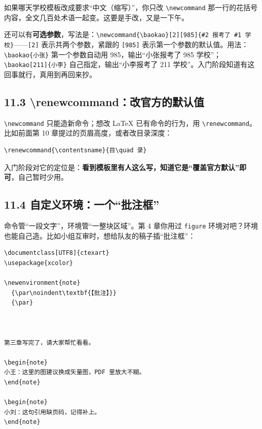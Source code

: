 如果哪天学校模板改成要求“中文（缩写）”，你只改 \texttt{\textbackslash{}newcommand} 那一行的花括号内容，全文几百处术语一起变。这要是手改，又是一下午。

还可以有\textbf{可选参数}，写法是：\texttt{\textbackslash{}newcommand\{\textbackslash{}baokao\}[2][985]\{\#2 报考了 \#1 学校\}}——\texttt{[2]} 表示共两个参数，紧跟的 \texttt{[985]} 表示第一个参数的默认值。用法：\texttt{\textbackslash{}baokao\{小张\}} 第一个参数自动用 985，输出“小张报考了 985 学校”；\texttt{\textbackslash{}baokao[211]\{小李\}} 自己指定，输出“小李报考了 211 学校”。入门阶段知道有这回事就行，真用到再回来抄。

\subsection*{11.3 \textbackslash{}renewcommand：改官方的默认值}

\texttt{\textbackslash{}newcommand} 只能造新命令；想改 LaTeX 已有命令的行为，用 \texttt{\textbackslash{}renewcommand}。比如前面第 10 章提过的页眉高度，或者改目录深度：

\begin{lstlisting}
\renewcommand{\contentsname}{目\quad 录}
\end{lstlisting}

入门阶段对它的定位是：\textbf{看到模板里有人这么写，知道它是“覆盖官方默认”即可}，自己暂时少用。

\subsection*{11.4 自定义环境：一个“批注框”}

命令管“一段文字”，环境管“一整块区域”。第 4 章你用过 \texttt{figure} 环境对吧？环境也能自己造。比如小组互审时，想给队友的稿子插“批注框”：

\begin{lstlisting}
\documentclass[UTF8]{ctexart}
\usepackage{xcolor}

\newenvironment{note}
  {\par\noindent\textbf{【批注】}}
  {\par}



第三章写完了，请大家帮忙看看。

\begin{note}
小王：这里的图建议换成矢量图，PDF 里放大不糊。
\end{note}

\begin{note}
小刘：这句引用缺页码，记得补上。
\end{note}


\end{lstlisting}

